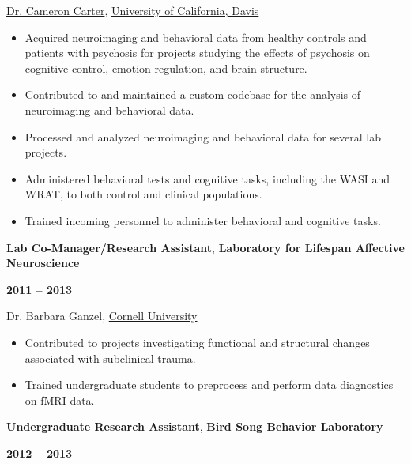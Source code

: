 \documentclass[10pt]{article}
\begin{document}
\href{http://carterlab.ucdavis.edu/people/carter.php}{Dr. Cameron Carter},
\href{https://www.ucdavis.edu}{University of California, Davis}

\begin{itemize}[noitemsep, nolistsep]
\item
  Acquired neuroimaging and behavioral data from healthy controls and
  patients with psychosis for projects studying the effects of psychosis
  on cognitive control, emotion regulation, and brain structure.
\item
  Contributed to and maintained a custom codebase for the analysis of
  neuroimaging and behavioral data.
\item
  Processed and analyzed neuroimaging and behavioral data for several
  lab projects.
\item
  Administered behavioral tests and cognitive tasks, including the WASI
  and WRAT, to both control and clinical populations.
\item
  Trained incoming personnel to administer behavioral and cognitive
  tasks.
\end{itemize}

\newpage

\begin{minipage}[t]{.85\linewidth}
	\flushleft
	\noindent
	\textbf{Lab Co-Manager/Research Assistant},
	\textbf{Laboratory for Lifespan Affective Neuroscience}
	\end{minipage}
	\hfill
	\begin{minipage}[t]{.15\linewidth}
	\flushright
	\noindent
	\textsc{\textbf{2011 -- 2013}}
\end{minipage}

Dr. Barbara Ganzel,
\href{http://www.cornell.edu}{Cornell University}

\begin{itemize}[noitemsep, nolistsep]
\item
  Contributed to projects investigating functional and structural
  changes associated with subclinical trauma.
\item
  Trained undergraduate students to preprocess and perform data
  diagnostics on fMRI data.
\end{itemize}

\bigskip

\begin{minipage}[t]{.85\linewidth}
	\flushleft
	\noindent
	\textbf{Undergraduate Research Assistant},
	\href{http://people.psych.cornell.edu/~devoogdlab/}{\textbf{Bird Song Behavior Laboratory}}
	\end{minipage}
	\hfill
	\begin{minipage}[t]{.15\linewidth}
	\flushright
	\noindent
	\textsc{\textbf{2012 -- 2013}}
\end{minipage}
\end{document}

